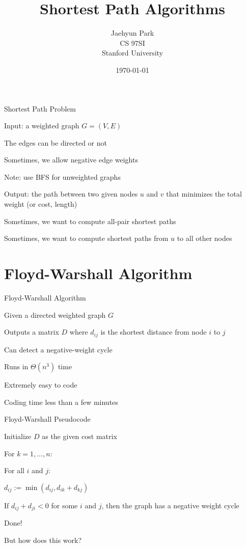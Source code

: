 \documentclass[13pt,onlymath]{beamer}
\title{\large \bfseries Shortest Path Algorithms}
\author{Jaehyun Park\\[3ex]
CS 97SI\\
Stanford University}
\date{\today}
\begin{document}
\frame{
\thispagestyle{empty}
\titlepage
}

\begin{frame}{Shortest Path Problem}
\BIT
\item Input: a weighted graph $G = (V, E)$
\BIT
\item The edges can be directed or not
\item Sometimes, we allow negative edge weights
\item Note: use BFS for unweighted graphs
\EIT
\item Output: the path between two given nodes $u$ and $v$ that minimizes the total weight (or cost, length)
\BIT
\item Sometimes, we want to compute all-pair shortest paths
\item Sometimes, we want to compute shortest paths from $u$ to all other nodes
\EIT \EIT
\end{frame}

\section{Floyd-Warshall Algorithm}

\begin{frame}{Floyd-Warshall Algorithm}
\BIT
\item Given a directed weighted graph $G$
\item Outputs a matrix $D$ where $d_{ij}$ is the shortest distance from node $i$ to $j$
\item Can detect a negative-weight cycle
\item Runs in $\Theta(n^3)$ time
\item Extremely easy to code
\BIT
\item Coding time less than a few minutes
\EIT
\EIT
\end{frame}

\begin{frame}{Floyd-Warshall Pseudocode}
\BIT
\item Initialize $D$ as the given cost matrix
\item For $k=1, \ldots, n$:
\BIT
\item For all $i$ and $j$:
\BIT
\item $d_{ij} := \min(d_{ij}, d_{ik}+d_{kj})$
\EIT \EIT
\item If $d_{ij} + d_{ji} < 0$ for some $i$ and $j$, then the graph has a negative weight cycle
\vfill
\item Done!
\BIT
\item But how does this work?
\EIT \EIT
\end{frame}
\end{document}
